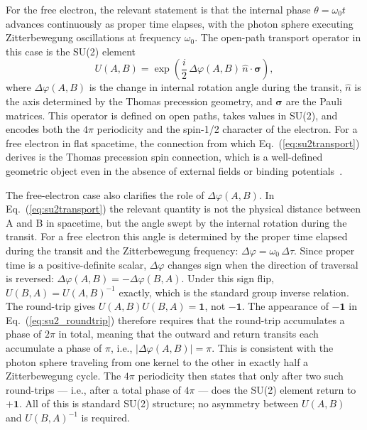 \documentclass[%
 reprint,
 amsmath,amssymb,
 aps,
 prb,
]{revtex4-2}
\numberwithin{equation}{section}
\newcommand{\iphase}{\theta}  %
\begin{document}
For the free electron, the relevant statement is that the internal phase $\iphase = \omega_0 t$ advances continuously as proper time elapses, with the photon sphere executing Zitterbewegung oscillations at frequency $\omega_0$. The open-path transport operator in this case is the SU(2) element
\begin{equation}
U(A,B) = \exp\!\left(\frac{i}{2}\,\Delta\varphi(A,B)\,\hat{n}\cdot\bm{\sigma}\right),
\label{eq:su2transport}
\end{equation}
where $\Delta\varphi(A,B)$ is the change in internal rotation angle during the transit, $\hat{n}$ is the axis determined by the Thomas precession geometry, and $\bm{\sigma}$ are the Pauli matrices. This operator is defined on open paths, takes values in SU(2), and encodes both the $4\pi$ periodicity and the spin-1/2 character of the electron. For a free electron in flat spacetime, the connection from which Eq.~(\ref{eq:su2transport}) derives is the Thomas precession spin connection, which is a well-defined geometric object even in the absence of external fields or binding potentials~\cite{paper13,paper26}.

The free-electron case also clarifies the role of $\Delta\varphi(A,B)$. In Eq.~(\ref{eq:su2transport}) the relevant quantity is not the physical distance between A and B in spacetime, but the angle swept by the internal rotation during the transit. For a free electron this angle is determined by the proper time elapsed during the transit and the Zitterbewegung frequency: $\Delta\varphi = \omega_0\,\Delta\tau$. Since proper time is a positive-definite scalar, $\Delta\varphi$ changes sign when the direction of traversal is reversed: $\Delta\varphi(A,B) = -\Delta\varphi(B,A)$. Under this sign flip, $U(B,A) = U(A,B)^{-1}$ exactly, which is the standard group inverse relation. The round-trip gives $U(A,B)U(B,A) = \mathbf{1}$, not $-\mathbf{1}$. The appearance of $-\mathbf{1}$ in Eq.~(\ref{eq:su2_roundtrip}) therefore requires that the round-trip accumulates a phase of $2\pi$ in total, meaning that the outward and return transits each accumulate a phase of $\pi$, i.e., $|\Delta\varphi(A,B)| = \pi$. This is consistent with the photon sphere traveling from one kernel to the other in exactly half a Zitterbewegung cycle. The $4\pi$ periodicity then states that only after two such round-trips --- i.e., after a total phase of $4\pi$ --- does the SU(2) element return to $+\mathbf{1}$. All of this is standard SU(2) structure; no asymmetry between $U(A,B)$ and $U(B,A)^{-1}$ is required.
\end{document}
